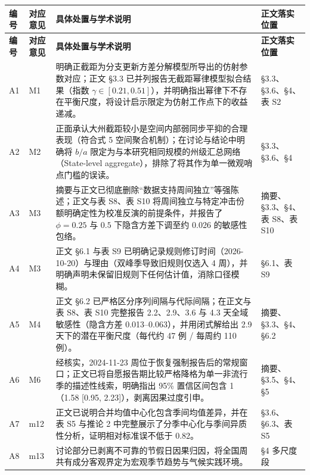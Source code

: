 \documentclass[UTF8,a4paper,11pt,fontset=none]{ctexart}
\begin{document}
{\small
\begin{longtable}{@{}>{\raggedright\arraybackslash}p{1.0cm}>{\raggedright\arraybackslash}p{1.6cm}>{\raggedright\arraybackslash}p{8.6cm}>{\raggedright\arraybackslash}p{3.3cm}@{}}
\toprule
\textbf{编号} & \textbf{对应意见} & \textbf{具体处置与学术说明} & \textbf{正文落实位置} \\
\midrule
\endfirsthead
\toprule
\textbf{编号} & \textbf{对应意见} & \textbf{具体处置与学术说明} & \textbf{正文落实位置} \\
\midrule
\endhead
\bottomrule
\endlastfoot
A1 & M1 & 明确正截距为分支更新方差分解模型所导出的仿射参数对应；正文 §3.3 已并列报告无截距幂律模型拟合结果（指数 $\gamma \in [0.21, 0.51]$），并明确指出幂律下不存在平衡尺度，将设计启示限定为仿射工作点下的收益递减。 & §3.3、§3.6、§4、表 S2 \\
\addlinespace[3pt]
A2 & M2 & 正面承认大州截距较小是空间内部弱同步平抑的合理表现（符合式 5 空间聚合机制）；在讨论与结论中明确将 $b/a$ 限定为与本研究相同规模的州级汇总网络（State-level aggregate），排除了将其作为单一微观哨点门槛的误读。 & §3.3、§3.6、§4 \\
\addlinespace[3pt]
A3 & M3 & 摘要与正文已彻底删除“数据支持周间独立”等强陈述；正文与表 S8、表 S10 将周间独立与特定冲击份额明确定性为校准反演的前提条件，并报告了 $\phi=0.25$ 与 $0.5$ 下隐含方差下调至约 0.026 的敏感性包络。 & 摘要、§3.3、§4、表 S8、表 S10 \\
\addlinespace[3pt]
A4 & M3 & 正文 §6.1 与表 S9 已明确记录规则修订时间（2026-10-20）与理由（双峰季导致旧规则仅选入 4 周），并明确声明未保留旧规则下任何估计值，消除口径模糊。 & §6.1、表 S9 \\
\addlinespace[3pt]
A5 & M4 & 正文 §6.2 已严格区分序列间隔与代际间隔；在正文与表 S8、表 S10 完整报告 2.2、2.9、3.6 与 4.3 天全域敏感性（隐含方差 0.013--0.063），并用闭式解给出 2.9 天下的潜在平衡尺度（每代约 47 例 / 每周约 110 例）。 & 摘要、§3.3、§4、§6.2 \\
\addlinespace[3pt]
A6 & M6 & 经核实，2024-11-23 周位于恢复强制报告后的常规窗口；正文已将自愿报告期比较严格降格为单一非流行季的描述性线索，明确指出 95\% 置信区间包含 1（1.58 [0.95, 2.23]），剥离因果过度引申。 & 摘要、§3.5、§4、§5 \\
\addlinespace[3pt]
A7 & m12 & 正文已说明合并均值中心化包含季间均值差异，并在表 S5 与推论 2 中完整展示了分季中心化与季间异质性分析，证明相对标准误不低于 0.82。 & §3.6、§6.3、表 S5 \\
\addlinespace[3pt]
A8 & m13 & 讨论部分已剥离不可靠的节假日因果归因，将全国周共有成分客观界定为宏观季节趋势与气候实践环境。 & §4 多尺度段 \\

\end{longtable}}
\end{document}
